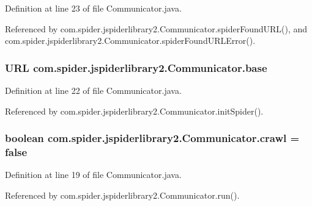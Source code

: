 \-Definition at line 23 of file \-Communicator.\-java.



\-Referenced by com.\-spider.\-jspiderlibrary2.\-Communicator.\-spider\-Found\-U\-R\-L(), and com.\-spider.\-jspiderlibrary2.\-Communicator.\-spider\-Found\-U\-R\-L\-Error().

\hypertarget{classcom_1_1spider_1_1jspiderlibrary2_1_1_communicator_ad0101fe504108054c599ff671b035ae7}{
\subsubsection[{base}]{\setlength{\rightskip}{0pt plus 5cm}\-U\-R\-L {\bf com.\-spider.\-jspiderlibrary2.\-Communicator.\-base}}}\label{classcom_1_1spider_1_1jspiderlibrary2_1_1_communicator_ad0101fe504108054c599ff671b035ae7}


\-Definition at line 22 of file \-Communicator.\-java.



\-Referenced by com.\-spider.\-jspiderlibrary2.\-Communicator.\-init\-Spider().

\hypertarget{classcom_1_1spider_1_1jspiderlibrary2_1_1_communicator_aa0fb097a1e3dd28c5b3595965d0ebcd7}{
\subsubsection[{crawl}]{\setlength{\rightskip}{0pt plus 5cm}boolean {\bf com.\-spider.\-jspiderlibrary2.\-Communicator.\-crawl} = false}}\label{classcom_1_1spider_1_1jspiderlibrary2_1_1_communicator_aa0fb097a1e3dd28c5b3595965d0ebcd7}


\-Definition at line 19 of file \-Communicator.\-java.



\-Referenced by com.\-spider.\-jspiderlibrary2.\-Communicator.\-run().

